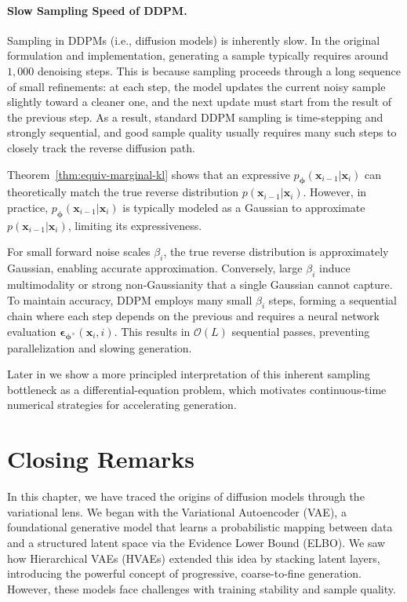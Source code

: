 \paragraph{Slow Sampling Speed of DDPM.} Sampling in DDPMs (i.e., diffusion models) is inherently slow. In the original formulation and implementation, generating a sample typically requires around $1{,}000$ denoising steps. This is because sampling proceeds through a long sequence of small refinements: at each step, the model updates the current noisy sample slightly toward a cleaner one, and the next update must start from the result of the previous step. As a result, standard DDPM sampling is time-stepping and strongly sequential, and good sample quality usually requires many such steps to closely track the reverse diffusion path.

Theorem~\ref{thm:equiv-marginal-kl} shows that an expressive $ p_{\bm{\phi}}(\mathbf{x}_{i-1} | \mathbf{x}_i) $ can theoretically match the true reverse distribution $ p(\mathbf{x}_{i-1} | \mathbf{x}_i) $. However, in practice, $ p_{\bm{\phi}}(\mathbf{x}_{i-1} | \mathbf{x}_i) $ is typically modeled as a Gaussian to approximate $ p(\mathbf{x}_{i-1} | \mathbf{x}_i) $, limiting its expressiveness.

For small forward noise scales $\beta_i$, the true reverse distribution is approximately Gaussian, enabling accurate approximation. Conversely, large $\beta_i$ induce multimodality or strong non-Gaussianity that a single Gaussian cannot capture. To maintain accuracy, DDPM employs many small $\beta_i$ steps, forming a sequential chain where each step depends on the previous and requires a neural network evaluation $\boldsymbol{\epsilon}_{\bm{\phi}^\times}(\mathbf{x}_i, i)$. This results in $\mathcal{O}(L)$ sequential passes, preventing parallelization and slowing generation.



Later in  we show a more principled interpretation of this inherent sampling bottleneck as a differential-equation problem, which motivates continuous-time numerical strategies for accelerating generation.



\newpage
\section{Closing Remarks}\label{sec:ch2_cr}


In this chapter, we have traced the origins of diffusion models through the variational lens. We began with the Variational Autoencoder (VAE), a foundational generative model that learns a probabilistic mapping between data and a structured latent space via the Evidence Lower Bound (ELBO). We saw how Hierarchical VAEs (HVAEs) extended this idea by stacking latent layers, introducing the powerful concept of progressive, coarse-to-fine generation. However, these models face challenges with training stability and sample quality.





